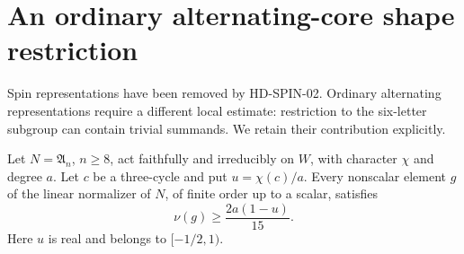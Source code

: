 \section{An ordinary alternating-core shape restriction}
\label{sec:ordinary-alternating-shapes}

Spin representations have been removed by HD-SPIN-02.  Ordinary
alternating representations require a different local estimate:
restriction to the six-letter subgroup can contain trivial summands.
We retain their contribution explicitly.

\begin{lemma}
\label{HD-ALT-01a}
Let $N=\mathfrak A_n$, $n\ge8$, act faithfully and irreducibly
on $W$, with character $\chi$ and degree $a$.  Let $c$ be a
three-cycle and put $u=\chi(c)/a$.  Every nonscalar element $g$
of the linear normalizer of $N$, of finite order up to a scalar,
satisfies
\[
                \nu(g)\ge\frac{2a(1-u)}{15}.              \tag{ALT.1}
\]
Here $u$ is real and belongs to $[-1/2,1)$.
\end{lemma}

